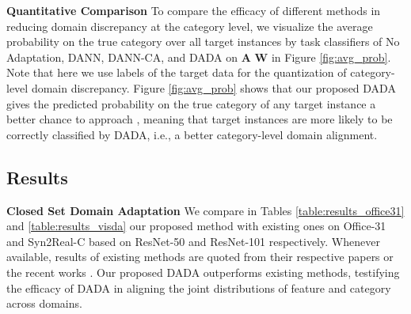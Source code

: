 \documentclass[letterpaper]{article} \usepackage{aaai20}  \usepackage{times}  \usepackage{helvet} \usepackage{courier}  \usepackage[hyphens]{url}  \usepackage{graphicx} \urlstyle{rm} \def\UrlFont{\rm}  \usepackage{graphicx}  \frenchspacing  \setlength{\pdfpagewidth}{8.5in}  \setlength{\pdfpageheight}{11in}
\begin{document}
\noindent\textbf{Quantitative Comparison} To compare the efficacy of different methods in reducing domain discrepancy at the category level, we visualize the average probability on the true category over all target instances by task classifiers of No Adaptation, DANN, DANN-CA, and DADA on \textbf{A}  \textbf{W} in Figure \ref{fig:avg_prob}. Note that here we use labels of the target data for the quantization of category-level domain discrepancy. Figure \ref{fig:avg_prob} shows that our proposed DADA gives the predicted probability on the true category of any target instance a better chance to approach , meaning that target instances are more likely to be correctly classified by DADA, i.e., a better category-level domain alignment.

\begin{table}[!htb]
	\begin{center}
		\caption{Results for partial domain adaptation on Syn2Real-C based on ResNet-50. Note that all compared methods are based on \textbf{PyTorch} implementation.}
		\label{table:results_visda_partial_transfer}
	\end{center}
\end{table}

\subsection{Results}
\noindent\textbf{Closed Set Domain Adaptation} We compare in Tables \ref{table:results_office31} and \ref{table:results_visda} our proposed method with existing ones on Office-31 and Syn2Real-C based on ResNet-50 and ResNet-101 respectively. Whenever available, results of existing methods are quoted from their respective papers or the recent works \cite{mada,cdan,tat,mcd}. Our proposed DADA outperforms existing methods, testifying the efficacy of DADA in aligning the joint distributions of feature and category across domains.
\end{document}

